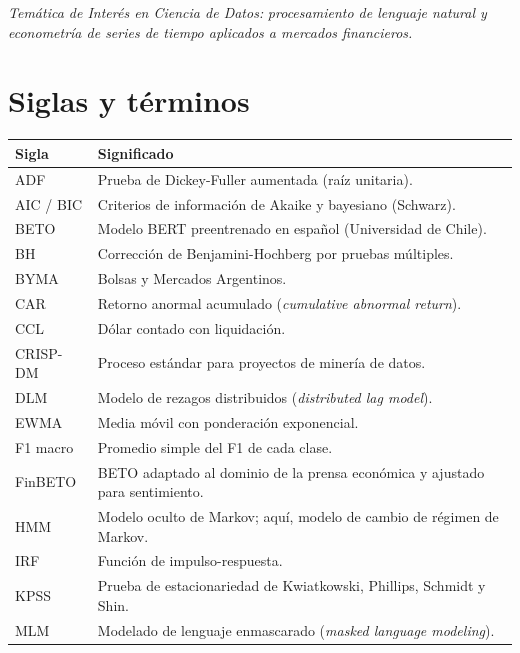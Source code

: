 \documentclass[11pt,a4paper,oneside]{report}
\begin{document}
\textit{Temática de Interés en Ciencia de Datos:} \textit{procesamiento de lenguaje natural
y econometría de series de tiempo aplicados a mercados financieros.}

\tableofcontents

\chapter*{Siglas y términos}
\begin{longtable}{@{}L{2.6cm}L{11.3cm}@{}}
\toprule
\textbf{Sigla} & \textbf{Significado} \\
\midrule
\endhead
ADF & Prueba de Dickey-Fuller aumentada (raíz unitaria). \\
AIC / BIC & Criterios de información de Akaike y bayesiano (Schwarz). \\
BETO & Modelo BERT preentrenado en español (Universidad de Chile). \\
BH & Corrección de Benjamini-Hochberg por pruebas múltiples. \\
BYMA & Bolsas y Mercados Argentinos. \\
CAR & Retorno anormal acumulado (\textit{cumulative abnormal return}). \\
CCL & Dólar contado con liquidación. \\
CRISP-DM & Proceso estándar para proyectos de minería de datos. \\
DLM & Modelo de rezagos distribuidos (\textit{distributed lag model}). \\
EWMA & Media móvil con ponderación exponencial. \\
F1 macro & Promedio simple del F1 de cada clase. \\
FinBETO & BETO adaptado al dominio de la prensa económica y ajustado para sentimiento. \\
HMM & Modelo oculto de Markov; aquí, modelo de cambio de régimen de Markov. \\
IRF & Función de impulso-respuesta. \\
KPSS & Prueba de estacionariedad de Kwiatkowski, Phillips, Schmidt y Shin. \\
MLM & Modelado de lenguaje enmascarado (\textit{masked language modeling}). \\

\end{longtable}
\end{document}
